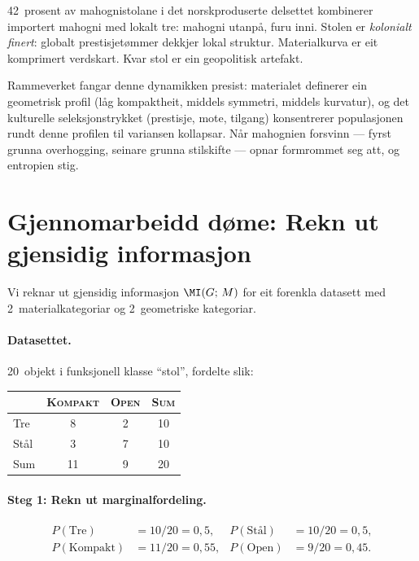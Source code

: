 42~prosent av mahognistolane i det norskproduserte delsettet
kombinerer importert mahogni med lokalt tre: mahogni utanpå, furu
inni. Stolen er \emph{kolonialt finert}: globalt prestisjetømmer
dekkjer lokal struktur. Materialkurva er eit komprimert verdskart.
Kvar stol er ein geopolitisk artefakt.

Rammeverket fangar denne dynamikken presist: materialet definerer
ein geometrisk profil (låg kompaktheit, middels symmetri, middels
kurvatur), og det kulturelle seleksjonstrykket (prestisje, mote,
tilgang) konsentrerer populasjonen rundt denne profilen til
variansen kollapsar. Når mahognien forsvinn --- fyrst grunna
overhogging, seinare grunna stilskifte --- opnar formrommet seg att,
og entropien stig.


\section{Gjennomarbeidd døme: Rekn ut gjensidig informasjon}

Vi reknar ut gjensidig informasjon $\MI(G;\, M)$ for eit forenkla
datasett med 2~materialkategoriar og 2~geometriske kategoriar.

\paragraph{Datasettet.}
20~objekt i funksjonell klasse ``stol'', fordelte slik:

\medskip
\begin{center}
\begin{tabular}{@{}lcc|c@{}}
\toprule
& \textsc{Kompakt} & \textsc{Open} & \textsc{Sum} \\
\midrule
Tre & 8 & 2 & 10 \\
Stål & 3 & 7 & 10 \\
\midrule
Sum & 11 & 9 & 20 \\
\bottomrule
\end{tabular}
\end{center}

\paragraph{Steg 1: Rekn ut marginalfordeling.}
\begin{align*}
  P(\text{Tre}) &= 10/20 = 0{,}5, &
  P(\text{Stål}) &= 10/20 = 0{,}5, \\
  P(\text{Kompakt}) &= 11/20 = 0{,}55, &
  P(\text{Open}) &= 9/20 = 0{,}45.
\end{align*}

